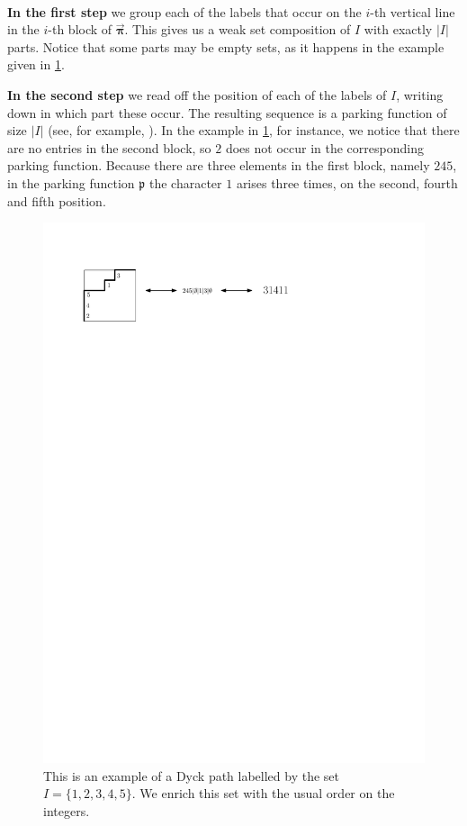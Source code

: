 \documentclass[12pt, reqno]{amsart}
\theoremstyle{definition}
\newcommand{\opi}{\vec{\boldsymbol{\pi}}}
\begin{document}
\

\textbf{In the first step} we group each of the labels that occur on the $i$-th vertical line in the $i$-th block of $\opi$.
This gives us a weak set composition of $I$ with exactly $|I|$ parts.
Notice that some parts may be empty sets, as it happens in the example given in \cref{fig:construction_parking}.

\textbf{In the second step} we read off the position of each of the labels of $I$, writing down in which part these occur. The resulting sequence is a parking function of size $|I|$ (see, for example, \cite{BGLPV2021}).
In the example in \cref{fig:construction_parking}, for instance, we notice that there are no entries in the second block, so $2$ does not occur in the corresponding parking function.
Because there are three elements in the first block, namely $245$, in the parking function $\mathfrak p $ the character $1$ arises three times, on the second, fourth and fifth position.

\begin{figure}
    \centering
    \includegraphics{images/correspondence_parking.pdf}
    \caption{This is an example of a Dyck path labelled by the set $I =\{1, 2, 3, 4, 5\}$. We enrich this set with the usual order on the integers.}
    \label{fig:construction_parking}
\end{figure}
\end{document}

